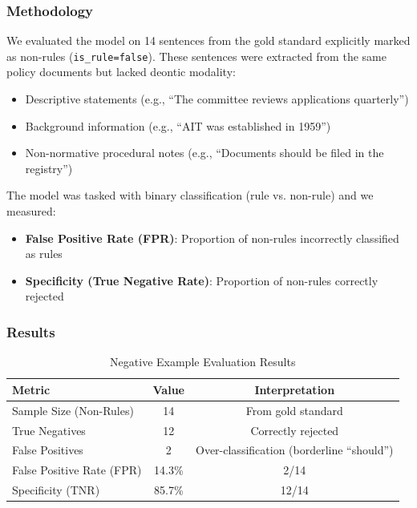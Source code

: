 \subsubsection{Methodology}

We evaluated the model on 14 sentences from the gold standard explicitly marked as non-rules (\texttt{is\_rule=false}). These sentences were extracted from the same policy documents but lacked deontic modality:

\begin{itemize}
    \item Descriptive statements (e.g., ``The committee reviews applications quarterly'')
    \item Background information (e.g., ``AIT was established in 1959'')
    \item Non-normative procedural notes (e.g., ``Documents should be filed in the registry'')
\end{itemize}

The model was tasked with binary classification (rule vs. non-rule) and we measured:
\begin{itemize}
    \item \textbf{False Positive Rate (FPR)}: Proportion of non-rules incorrectly classified as rules
    \item \textbf{Specificity (True Negative Rate)}: Proportion of non-rules correctly rejected
\end{itemize}

\subsubsection{Results}

\begin{table}[htbp]
\centering
\caption{Negative Example Evaluation Results}
\label{tab:negative-examples}
\begin{tabular}{lcc}
\toprule
\textbf{Metric} & \textbf{Value} & \textbf{Interpretation} \\
\midrule
Sample Size (Non-Rules) & 14 & From gold standard \\
True Negatives & 12 & Correctly rejected \\
False Positives & 2 & Over-classification (borderline ``should'') \\
\midrule
False Positive Rate (FPR) & 14.3\% & 2/14 \\
Specificity (TNR) & 85.7\% & 12/14 \\
\bottomrule
\end{tabular}
\end{table}

